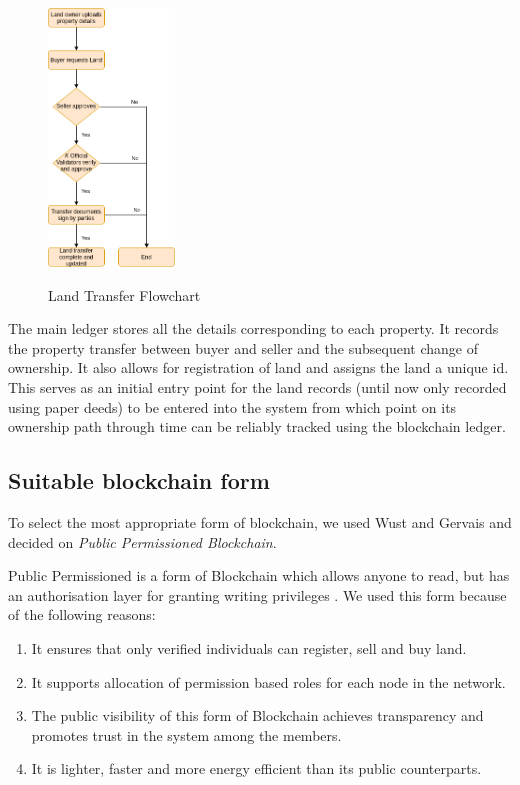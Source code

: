 \documentclass[conference]{IEEEtran}
\begin{document}
\begin{figure}[h]
\centering
\includegraphics[width=0.3\textwidth]{LandTitle.png}
\begin{center}
    \tiny{Land Transfer Flowchart}
\end{center}
\end{figure}

The main ledger stores all the details corresponding to each property. It records the property transfer between buyer and seller and the subsequent change of ownership. It also allows for registration of land and assigns the land a unique id. This serves as an initial entry point for the land records (until now only recorded using paper deeds) to be entered into the system from which point on its ownership path through time can be reliably tracked using the blockchain ledger. 


\subsection{Suitable blockchain form}
To select the most appropriate form of blockchain, we used Wust and Gervais \cite{b1} and decided on \textit{Public Permissioned Blockchain}.

Public Permissioned is a form of Blockchain which allows anyone to read, but has an authorisation layer for granting writing privileges \cite{b2}. We used this form because of the following reasons:
\begin{enumerate}
    \item It ensures that only verified individuals can register, sell and buy land.
    \item It supports allocation of permission based roles for each node in the network.
    \item The public visibility of this form of Blockchain achieves transparency and promotes trust in the system among the members.
    \item It is lighter, faster and more energy efficient than its public counterparts.
\end{enumerate}
\end{document}
